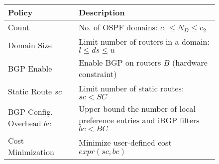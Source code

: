 \begin{figure}
\vspace{-2mm}
\small
\begin{minipage}{\columnwidth}
	\begin{tabular}{m{8em}  m{19em} } 
			{\bf Policy} & {\bf Description} \\ 
			\hline
			Count  & No. of OSPF domains: $c_1\leq N_D\leq c_2$  \\ \hline
			Domain Size  & Limit number of routers in a domain: $l\leq ds\leq u$ \\ \hline
			BGP Enable & Enable BGP on routers $B$ (hardware constraint) \\ \hline
			Static Route ${sc}$ & Limit number of static routes: $sc < SC$ \\ \hline
			BGP Config. Overhead $bc$ & Upper bound the number of local preference entries and iBGP filters $bc < BC$ \\ \hline
			Cost Minimization & Minimize user-defined cost $expr(sc, bc)$
		\end{tabular}
				
	\end{minipage}
\label{tab:configpolicysupport}
\end{figure}